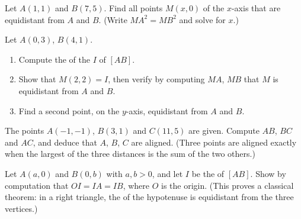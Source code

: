\begin{exercise}[$\star\star$]\label{exo:g10:coordgeom:7}
Let $A(1, 1)$ and $B(7, 5)$. Find all points $M(x, 0)$ of the $x$-axis
that are equidistant from $A$ and $B$. (Write $MA^2 = MB^2$ and solve for
$x$.)
\end{exercise}

\begin{exercise}[$\star\star$]\label{exo:g10:coordgeom:8}
Let $A(0, 3)$, $B(4, 1)$.
\begin{enumerate}
  \item Compute the  of the  $I$ of $[AB]$.
  \item Show that $M(2, 2) = I$, then verify by computing $MA$, $MB$ that
        $M$ is equidistant from $A$ and $B$.
  \item Find a second point, on the $y$-axis, equidistant from $A$ and
        $B$.
\end{enumerate}
\end{exercise}

\begin{exercise}[$\star\star$]\label{exo:g10:coordgeom:9}
The points $A(-1, -1)$, $B(3, 1)$ and $C(11, 5)$ are given. Compute $AB$,
$BC$ and $AC$, and deduce that $A$, $B$, $C$ are aligned. (Three points
are aligned exactly when the largest of the three distances is the sum of
the two others.)
\end{exercise}

\begin{exercise}[$\star\star\star$]\label{exo:g10:coordgeom:10}
Let $A(a, 0)$ and $B(0, b)$ with $a, b > 0$, and let $I$ be the 
of $[AB]$. Show by computation that $OI = IA = IB$, where $O$ is the
origin. (This proves a classical theorem: in a right triangle, the
 of the hypotenuse is equidistant from the three vertices.)
\end{exercise}
